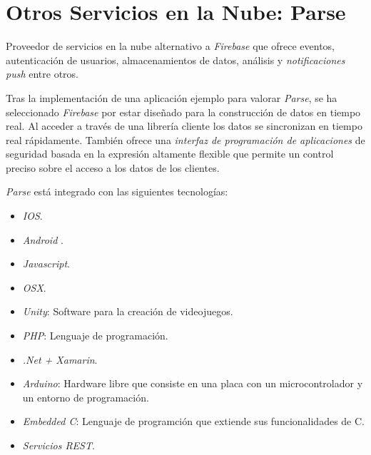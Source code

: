 	\section{Otros Servicios en la Nube: Parse \cite{16:parse:online}}
	Proveedor de servicios en la nube alternativo a {\it Firebase} que ofrece eventos, autenticación de usuarios, almacenamientos de datos, análisis y {\it notificaciones push} entre otros.
	
	\bigskip
	Tras la implementación de una aplicación ejemplo para valorar {\it Parse}, se ha seleccionado {\it Firebase} por estar diseñado para la construcción de datos en tiempo real. Al acceder a través de una librería cliente los datos se sincronizan en tiempo real rápidamente. También ofrece una {\it interfaz de programación de aplicaciones} \cite{23:api:online}  de seguridad basada en la expresión altamente flexible que permite un control preciso sobre el acceso a los datos de los clientes.
	
	\bigskip
	{\it Parse} está integrado con las siguientes tecnologías:
	\begin{itemize}
		\setlength{\itemsep}{1pt}
		\setlength{\parskip}{0pt}
		\setlength{\parsep}{0pt}
		\item {\it IOS}.
		\item {\it Android} \cite{2:android:online}.
		\item {\it Javascript}.
		\item {\it OSX}.
		\item {\it Unity}: Software para la creación de videojuegos.
		\item {\it PHP}: Lenguaje de programación.
		\item {\it .Net + Xamarin}.
		\item {\it Arduino}: Hardware libre que consiste en una placa con un microcontrolador y un entorno de programación.
		\item {\it Embedded C}: Lenguaje de programción que extiende sus funcionalidades de C.
		\item {\it Servicios REST}.
	\end{itemize}
	
